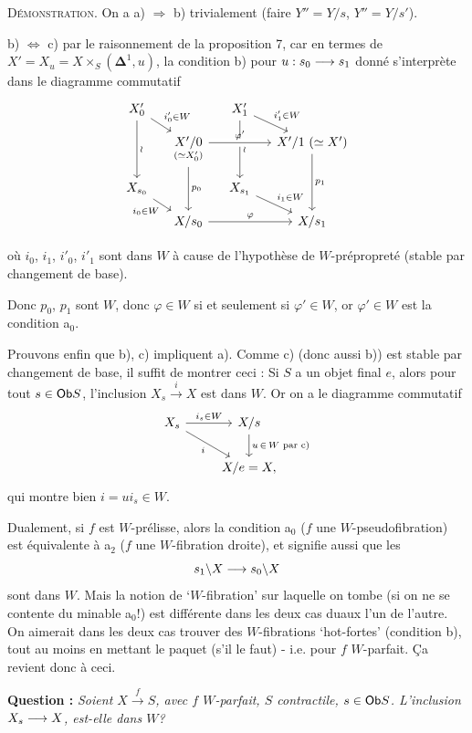 \textsc{Démonstration}. On a a) $\Longrightarrow$ b) trivialement (faire $Y''=Y/s$, $Y''=Y/s'$).

b) $\Longleftrightarrow$ c) par le raisonnement de la proposition 7, car en termes de $X'=X_u=X\times_S(\boldsymbol{\Delta}^1,u)$, la condition b) pour $u : s_0\longrightarrow s_1$ donné s'interprète dans le diagramme commutatif
\[
\begin{tikzcd}[column sep=small, row sep=small]
X'_0 \arrow[dr, "i'_0\in W"] \arrow[dd, "\wr"] & & X'_1 \arrow[dr, "i'_1\in W"] \arrow[dd, "\wr"] & \\
 & \underset{(\simeq X'_0)}{X'/0} \arrow[rr, "\varphi'", crossing over] \arrow[dd, "p_0"] & & X'/1\ (\simeq X') \arrow[dd, "p_1"] \\
X_{s_0} \arrow[dr, "i_0\in W"'] & & X_{s_1} \arrow[dr, "i_1\in W"] & \\
 & X/s_0 \arrow[rr, "\varphi"] & & X/s_1
\end{tikzcd}
\]

 où $i_0$, $i_1$, $i'_0$, $i'_1$ sont dans $W$ à cause de l'hypothèse de $W$-prépropreté (stable par changement de base).

Donc $p_0$, $p_1$ sont $W$, donc $\varphi\in W$ si et seulement si $\varphi'\in W$, or $\varphi'\in W$ est la condition a$_0$.

Prouvons enfin que b), c) impliquent a). Comme c) (donc aussi b)) est stable par changement de base, il suffit de montrer ceci : Si $S$ a un objet final $e$, alors pour tout $s\in\mathsf{Ob} S$, l'inclusion $X_s\xrightarrow{\ i\ }X$ est dans $W$. Or on a le diagramme commutatif
\[
\begin{tikzcd}
X_s \arrow[r, "i_s\in W"] \arrow[dr, "i"'] & X/s \arrow[d, "u\,\in\,W\text{ par c) }"] \\
 & X/e=X,
\end{tikzcd}
\]
qui montre bien $i=ui_s\in W$.

Dualement, si $f$ est $W$-prélisse, alors la condition a$_0$ ($f$ une $W$-pseudofibration) est équivalente à a$_2$ ($f$ une $W$-fibration droite), et signifie aussi que les
\[ s_1\backslash X\longrightarrow s_0\backslash X \]
sont dans $W$. Mais la notion de ‘$W$-fibration’ sur laquelle on tombe (si on ne se contente du minable a$_0$!) est différente dans les deux cas duaux l'un de l'autre. On aimerait dans les deux cas trouver des $W$-fibrations ‘hot-fortes’ (condition b), tout au moins en mettant le paquet (s'il le faut) - i.e. pour $f$ $W$-parfait. Ça revient donc à ceci.

\textbf{Question :} \textit{Soient $X\xrightarrow{\ f\ }S$, avec $f$ $W$-parfait, $S$ contractile, $s\in\mathsf{Ob} S$. L'inclusion $X_s\longrightarrow X$, est-elle dans $W$?}

